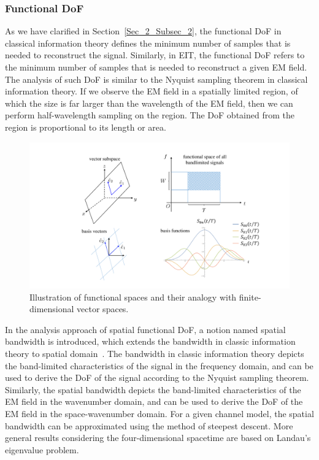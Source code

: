 \documentclass[journal,twocolumn]{IEEEtran}
\begin{document}
\subsubsection{Functional DoF}
As we have clarified in Section~\ref{Sec_2_Subsec_2}, the functional DoF in classical information theory defines the minimum number of samples that is needed to reconstruct the signal. Similarly, in EIT, the functional DoF refers to the minimum number of samples that is needed to reconstruct a given EM field. The analysis of such DoF is similar to the Nyquist sampling theorem in classical information theory. If we observe the EM field in a spatially limited region, of which the size is far larger than the wavelength of the EM field, then we can perform half-wavelength sampling on the region. The DoF obtained from the region is proportional to its length or area. 

\begin{figure}
	\centering 
	\includegraphics[width=\linewidth]{figures/PSWF.pdf} 
	\caption{Illustration of functional spaces and their analogy with finite-dimensional vector spaces. }
	\label{fig:PSWF}
\end{figure}

In the analysis approach of spatial functional DoF, a notion named spatial bandwidth is introduced, which extends the bandwidth in classic information theory to spatial domain~\cite{bucci1987spatial}. The bandwidth in classic information theory depicts the band-limited characteristics of the signal in the frequency domain, and can be used to derive the DoF of the signal according to the Nyquist sampling theorem. Similarly, the spatial bandwidth depicts the band-limited characteristics of the EM field in the wavenumber domain, and can be used to derive the DoF of the EM field in the space-wavenumber domain. For a given channel model, the spatial bandwidth can be approximated using the method of steepest descent. More general results considering the four-dimensional spacetime are based on Landau's eigenvalue problem.
\end{document}
